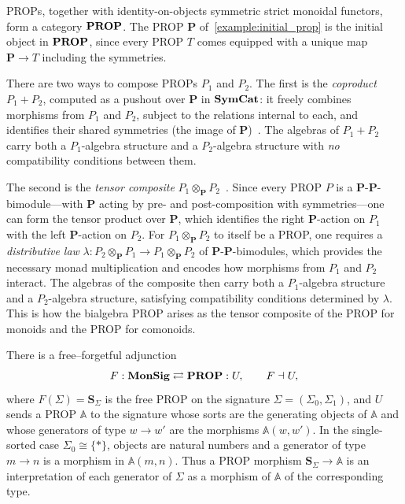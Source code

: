 \begin{remark}\label{remark:composing_props}
PROPs, together with identity-on-objects symmetric strict monoidal functors, 
form a category $\mathbf{PROP}$. The PROP $\mathbf{P}$ 
of~\cref{example:initial_prop} is the initial object in $\mathbf{PROP}$,
since every PROP $T$ comes equipped with a unique map $\mathbf{P} \to T$
including the symmetries.

There are two ways to compose PROPs $P_1$ and $P_2$. The first is 
the \emph{coproduct} $P_1 + P_2$, computed as a pushout over $\mathbf{P}$
in $\mathbf{SymCat}$: it freely combines morphisms from $P_1$ and $P_2$,
subject to the relations internal to each, and identifies their shared 
symmetries (the image of $\mathbf{P}$)~\cite{bonchi_string_2022-1}. The algebras of $P_1 + P_2$ 
carry both a $P_1$-algebra structure and a $P_2$-algebra structure 
with \emph{no} compatibility conditions between them.

The second is the \emph{tensor composite} $P_1 \otimes_{\mathbf{P}} P_2$~\cite{lackDedicatedAurelioCarboni}.
Since every PROP $P$ is a $\mathbf{P}$-$\mathbf{P}$-bimodule---with 
$\mathbf{P}$ acting by pre- and post-composition with symmetries---one can form the tensor product over $\mathbf{P}$, which identifies 
the right $\mathbf{P}$-action on $P_1$ with the left $\mathbf{P}$-action 
on $P_2$. For $P_1 \otimes_{\mathbf{P}} P_2$ to itself be a PROP, one 
requires a \emph{distributive law} $\lambda \colon P_2 \otimes_{\mathbf{P}} 
P_1 \to P_1 \otimes_{\mathbf{P}} P_2$ of $\mathbf{P}$-$\mathbf{P}$-bimodules,
which provides the necessary monad multiplication and encodes how 
morphisms from $P_1$ and $P_2$ interact. The algebras of the composite 
then carry both a $P_1$-algebra structure and a $P_2$-algebra structure,
satisfying compatibility conditions determined by $\lambda$. This is how 
the bialgebra PROP arises as the tensor composite of the PROP for 
monoids and the PROP for comonoids.
\end{remark}

\begin{proposition}\label{prop:prop-ump}
There is a free--forgetful adjunction
\[
F : \mathbf{MonSig} \rightleftarrows \mathbf{PROP} : U,
\qquad F \dashv U,
\]
where $F(\Sigma) = \mathbf{S}_\Sigma$ is the free PROP on the signature
$\Sigma = (\Sigma_0, \Sigma_1)$, and $U$ sends a PROP $\mathbb{A}$ to the
signature whose sorts are the generating objects of $\mathbb{A}$ and whose
generators of type $w \to w'$ are the morphisms $\mathbb{A}(w, w')$. In
the single-sorted case $\Sigma_0 \cong \{*\}$, objects are natural numbers
and a generator of type $m \to n$ is a morphism in $\mathbb{A}(m,n)$. Thus
a PROP morphism $\mathbf{S}_\Sigma \to \mathbb{A}$ is an interpretation of
each generator of $\Sigma$ as a morphism of $\mathbb{A}$ of the
corresponding type.
\end{proposition}

